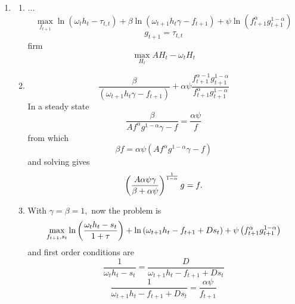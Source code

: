\documentclass[12pt]{article}
\begin{document}
\begin{enumerate}
\item 
\begin{enumerate}
\item ...%
\begin{equation*}
\underset{f_{t+1}}{\max }\ln \left( \omega _{t}h_{t}-\tau _{t,t}\right)
+\beta \ln \left( \omega _{t+1}h_{t}\gamma -f_{t+1}\right) +\psi \ln \left(
f_{t+1}^{\alpha }g_{t+1}^{1-\alpha }\right) 
\end{equation*}%
\begin{equation*}
g_{t+1}=\tau _{t,t}
\end{equation*}%
firm%
\begin{equation*}
\underset{H_{t}}{\max }AH_{t}-\omega _{t}H_{t}
\end{equation*}

\item 
\begin{equation*}
\frac{\beta }{\left( \omega _{t+1}h_{t}\gamma -f_{t+1}\right) }+\alpha \psi 
\frac{f_{t+1}^{\alpha -1}g_{t+1}^{1-\alpha }}{f_{t+1}^{\alpha
}g_{t+1}^{1-\alpha }}
\end{equation*}%
In a steady state%
\begin{equation*}
\frac{\beta }{Af^{\alpha }g^{1-\alpha }\gamma -f}=\frac{\alpha \psi }{f}
\end{equation*}%
from which 
\begin{equation*}
\beta f=\alpha \psi \left( Af^{\alpha }g^{1-\alpha }\gamma -f\right) 
\end{equation*}%
and solving gives%
\begin{equation*}
\left( \frac{A\alpha \psi \gamma }{\beta +\alpha \psi }\right) ^{\frac{1}{%
1-\alpha }}g=f.
\end{equation*}

\item With $\gamma =\beta =1,$ now the problem is 
\begin{equation*}
\underset{f_{t+1},s_{t}}{\max }\ln \left( \frac{\omega _{t}h_{t}-s_{t}}{%
1+\tau }\right) +\ln \left( \omega _{t+1}h_{t}-f_{t+1}+Ds_{t}\right) +\psi
\left( f_{t+1}^{\alpha }g_{t+1}^{1-\alpha }\right) 
\end{equation*}%
and first order conditions are%
\begin{equation*}
\frac{1}{\omega _{t}h_{t}-s_{t}}=\frac{D}{\omega _{t+1}h_{t}-f_{t+1}+Ds_{t}}
\end{equation*}%
\begin{equation*}
\frac{1}{\omega _{t+1}h_{t}-f_{t+1}+Ds_{t}}=\frac{\alpha \psi }{f_{t+1}}
\end{equation*}


\end{enumerate}
\end{enumerate}
\end{document}
